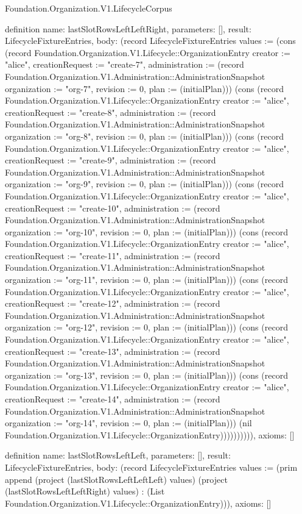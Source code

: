 \begin{lexlean}{Foundation.Organization.V1.LifecycleCorpus}
\begin{semanticmodule}
definition{
  name: lastSlotRowsLeftLeftRight,
  parameters: [],
  result: LifecycleFixtureEntries,
  body: (record LifecycleFixtureEntries {values := (cons (record Foundation.Organization.V1.Lifecycle::OrganizationEntry {creator := "alice", creationRequest := "create-7", administration := (record Foundation.Organization.V1.Administration::AdministrationSnapshot {organization := "org-7", revision := 0, plan := (initialPlan)})}) (cons (record Foundation.Organization.V1.Lifecycle::OrganizationEntry {creator := "alice", creationRequest := "create-8", administration := (record Foundation.Organization.V1.Administration::AdministrationSnapshot {organization := "org-8", revision := 0, plan := (initialPlan)})}) (cons (record Foundation.Organization.V1.Lifecycle::OrganizationEntry {creator := "alice", creationRequest := "create-9", administration := (record Foundation.Organization.V1.Administration::AdministrationSnapshot {organization := "org-9", revision := 0, plan := (initialPlan)})}) (cons (record Foundation.Organization.V1.Lifecycle::OrganizationEntry {creator := "alice", creationRequest := "create-10", administration := (record Foundation.Organization.V1.Administration::AdministrationSnapshot {organization := "org-10", revision := 0, plan := (initialPlan)})}) (cons (record Foundation.Organization.V1.Lifecycle::OrganizationEntry {creator := "alice", creationRequest := "create-11", administration := (record Foundation.Organization.V1.Administration::AdministrationSnapshot {organization := "org-11", revision := 0, plan := (initialPlan)})}) (cons (record Foundation.Organization.V1.Lifecycle::OrganizationEntry {creator := "alice", creationRequest := "create-12", administration := (record Foundation.Organization.V1.Administration::AdministrationSnapshot {organization := "org-12", revision := 0, plan := (initialPlan)})}) (cons (record Foundation.Organization.V1.Lifecycle::OrganizationEntry {creator := "alice", creationRequest := "create-13", administration := (record Foundation.Organization.V1.Administration::AdministrationSnapshot {organization := "org-13", revision := 0, plan := (initialPlan)})}) (cons (record Foundation.Organization.V1.Lifecycle::OrganizationEntry {creator := "alice", creationRequest := "create-14", administration := (record Foundation.Organization.V1.Administration::AdministrationSnapshot {organization := "org-14", revision := 0, plan := (initialPlan)})}) (nil Foundation.Organization.V1.Lifecycle::OrganizationEntry)))))))))}),
  axioms: []
}

definition{
  name: lastSlotRowsLeftLeft,
  parameters: [],
  result: LifecycleFixtureEntries,
  body: (record LifecycleFixtureEntries {values := (prim append (project (lastSlotRowsLeftLeftLeft) values) (project (lastSlotRowsLeftLeftRight) values) : (List Foundation.Organization.V1.Lifecycle::OrganizationEntry))}),
  axioms: []
}


\end{semanticmodule}
\end{lexlean}
